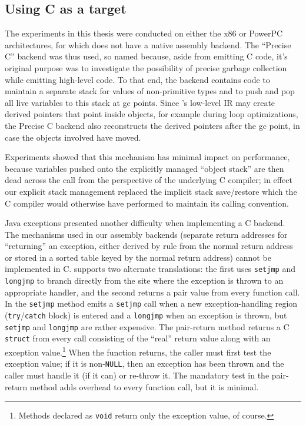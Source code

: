 \subsection*{Using C as a target}\label{sec:precisec}
The experiments in this thesis were conducted on either the x86 or
PowerPC architectures, for which \flex does not have a native assembly
backend.  The ``Precise C'' backend was thus used, so named because,
aside from emitting C code, it's original purpose was to investigate
the possibility of precise garbage collection while emitting
high-level code.  To that end, the backend contains code to maintain a
separate stack for values of non-primitive types and to push and pop
all live variables to this stack at gc points.  Since \flex's low-level
IR may create derived pointers that point inside objects, for example
during loop optimizations, the Precise C backend also reconstructs
the derived pointers after the gc point, in case the objects involved
have moved.\label{sec:precise-gc}

Experiments showed that this mechanism has minimal impact on
performance, because variables pushed onto the explicitly managed
``object stack'' are then dead across the call from the perspective
of the underlying C compiler; in effect our explicit stack management
replaced the implicit stack save/restore which the C compiler would
otherwise have performed to maintain its calling convention.

Java exceptions presented another difficulty when implementing a C
backend.  The mechanisms used in our assembly backends (separate
return addresses for ``returning'' an exception, either derived by
rule from the normal return address or stored in a sorted table keyed
by the normal return address) cannot be implemented in C\@.  \Flex supports
two alternate translations: the first uses \texttt{setjmp} and
\texttt{longjmp} to branch directly from the site where the exception
is thrown to an appropriate handler, and the second returns a pair
value from every function call.  In the \texttt{setjmp} method \flex emits
a \texttt{setjmp} call when a new exception-handling region
(\texttt{try}/\texttt{catch} block) is entered and a \texttt{longjmp}
when an exception is thrown,
but \texttt{setjmp} and \texttt{longjmp} are rather
expensive.  The pair-return method returns a C \texttt{struct} from every
call consisting of the ``real'' return value along with an exception
value.\footnote{Methods declared as \texttt{void} return only the
  exception value, of course.}  When the function returns, the caller
must first test the exception value; if it is non-\texttt{NULL}, then
an exception has been thrown and the caller must handle it (if it can)
or re-throw it.
The mandatory test in the pair-return method adds overhead to every
function call, but it is minimal.  


